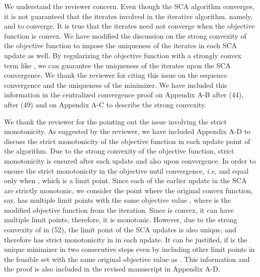 \begin{enumerate}
\resp We understand the reviewer concern. Even though the \ac{SCA} algorithm converges, it is not guaranteed that the iterates involved in the iterative algorithm, namely,  and  to converge. It is true that the iterates need not converge when the objective function is convex. We have modified the discussion on the strong convexity of the objective function to impose the uniqueness of the iterates in each \ac{SCA} update as well. By regularizing the objective function with a strongly convex term like , we can guarantee the uniqueness of the iterates upon the \ac{SCA} convergence. We thank the reviewer for citing this issue on the sequence convergence and the uniqueness of the minimizer. We have included this information in the centralized convergence proof on Appendix A-B after (44), after (49) and on Appendix A-C to describe the strong convexity.

  

\resp We thank the reviewer for the pointing out the issue involving the strict monotonicity. As suggested by the reviewer, we have included Appendix A-D to discuss the strict monotonicity of the objective function in each update point of the algorithm. Due to the strong convexity of the objective function, strict monotonicity is ensured after each update and also upon convergence. In order to ensure the strict monotonicity in the objective until convergence, \textit{i.e},  and equal only when , which is a limit point. Since each of the earlier update in the \ac{SCA} are strictly monotonic, we consider the point where the original convex function, say,  has multiple limit points with the same objective value , where  is the modified objective function from the  iteration. Since  is convex, it can have multiple limit points, therefore, it is monotonic. However, due to the strong convexity of  in (52), the limit point of the \ac{SCA} updates is also unique, and therefore has strict monotonicity in  in each update. It can be justified, if  is the unique minimizer in two consecutive steps even by including other limit points in the feasible set  with the same original objective value as . This information and the proof is also included in the revised manuscript in Appendix A-D.


\end{enumerate}
